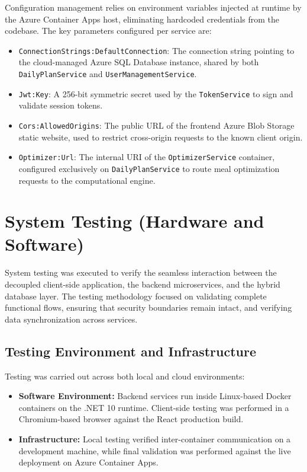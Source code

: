 Configuration management relies on environment variables injected at runtime by the Azure
Container Apps host, eliminating hardcoded credentials from the codebase. The key
parameters configured per service are:
\begin{itemize}
    \item \texttt{ConnectionStrings:DefaultConnection}: The connection string pointing to
    the cloud-managed Azure SQL Database instance, shared by both \texttt{DailyPlanService}
    and \texttt{UserManagementService}.
    \item \texttt{Jwt:Key}: A 256-bit symmetric secret used by the \texttt{TokenService}
    to sign and validate session tokens.
    \item \texttt{Cors:AllowedOrigins}: The public URL of the frontend Azure Blob Storage
    static website, used to restrict cross-origin requests to the known client origin.
    \item \texttt{Optimizer:Url}: The internal URI of the
    \texttt{OptimizerService} container, configured exclusively on \texttt{DailyPlanService}
    to route meal optimization requests to the computational engine.
\end{itemize}

\section{System Testing (Hardware and Software)}

System testing was executed to verify the seamless interaction between the 
decoupled client-side application, the backend microservices, and the hybrid 
database layer. The testing methodology focused on validating complete 
functional flows, ensuring that security boundaries remain intact, and 
verifying data synchronization across services.

\subsection{Testing Environment and Infrastructure}
Testing was carried out across both local and cloud environments:
\begin{itemize}
    \item \textbf{Software Environment:} Backend services run inside Linux-based
    Docker containers on the .NET 10 runtime. Client-side testing was performed
    in a Chromium-based browser against the React production build.
    \item \textbf{Infrastructure:} Local testing verified inter-container
    communication on a development machine, while final validation was performed
    against the live deployment on Azure Container Apps.
\end{itemize}


